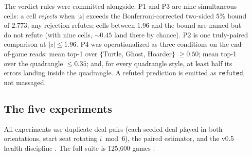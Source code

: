 \documentclass[11pt]{article}
\newcommand{\code}[1]{\texttt{#1}}
\begin{document}
The verdict rules were committed alongside. P1 and P3 are nine simultaneous cells: a cell
\emph{rejects} when $|z|$ exceeds the Bonferroni-corrected two-sided $5\%$ bound of
$2.773$; any rejection refutes; cells between $1.96$ and the bound are named but do not
refute (with nine cells, ${\sim}0.45$ land there by chance). P2 is one truly-paired
comparison at $|z| \le 1.96$. P4 was operationalized as three conditions on the
end-of-game reads: mean top-1 over $\{$Turtle, Ghost, Hoarder$\}$ $\ge 0.50$; mean top-1
over the quadrangle $\le 0.35$; and, for every quadrangle style, at least half its errors
landing inside the quadrangle. A refuted prediction is emitted as \code{refuted}, not
massaged.

\subsection{The five experiments}
\label{sec:experiments}

All experiments use duplicate deal pairs (each seeded deal played in both orientations,
start seat rotating $i \bmod 6$), the paired estimator, and the v0.5 health discipline
\cite{botlab,v05paper}. The full suite is 125{,}600 games \cite{artifact}:
\end{document}

